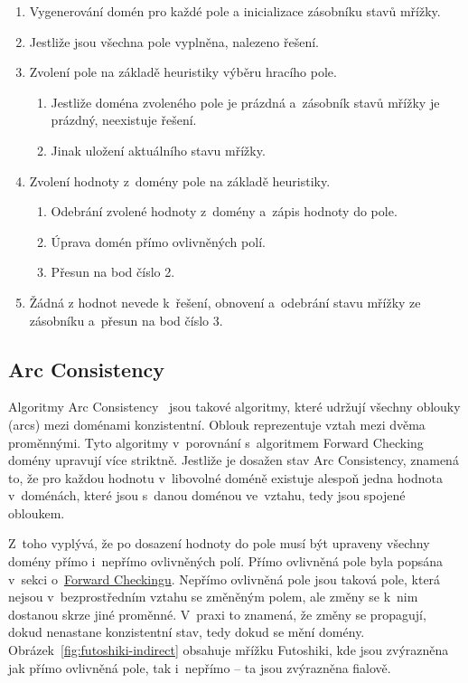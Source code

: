 \begin{enumerate}
    \item Vygenerování domén pro každé pole a inicializace zásobníku stavů
        mřížky.
    \item Jestliže jsou všechna pole vyplněna, nalezeno řešení.
    \item Zvolení pole na základě heuristiky výběru hracího pole.
    \begin{enumerate}
        \item Jestliže doména zvoleného pole je prázdná a~zásobník stavů mřížky
            je prázdný, neexistuje řešení.
        \item Jinak uložení aktuálního stavu mřížky.
    \end{enumerate}
    \item Zvolení hodnoty z~domény pole na základě heuristiky.
    \begin{enumerate}
        \item Odebrání zvolené hodnoty z~domény a~zápis hodnoty do pole.
        \item Úprava domén přímo ovlivněných polí.
        \item Přesun na bod číslo 2.
    \end{enumerate}
    \item Žádná z hodnot nevede k~řešení, obnovení a~odebrání stavu mřížky ze
        zásobníku a~přesun na bod číslo 3.
\end{enumerate}

\subsection{Arc Consistency}

Algoritmy Arc Consistency~\cite{ConsistencyTechniques} jsou takové algoritmy,
které udržují všechny oblouky (arcs) mezi doménami konzistentní. Oblouk
reprezentuje vztah mezi dvěma proměnnými. Tyto algoritmy v~porovnání
s~algoritmem Forward Checking domény upravují více striktně. Jestliže je
dosažen stav Arc Consistency, znamená to, že pro každou hodnotu v~libovolné
doméně existuje alespoň jedna hodnota v~doménách, které jsou s~danou doménou
ve~vztahu, tedy jsou spojené obloukem.

Z~toho vyplývá, že po dosazení hodnoty do pole musí být upraveny všechny domény
přímo i~nepřímo ovlivněných polí. Přímo ovlivněná pole byla popsána v~sekci
o~\hyperref[sec:forwardChecking]{Forward Checkingu}. Nepřímo ovlivněná pole
jsou taková pole, která nejsou v~bezprostředním vztahu se změněným polem, ale
změny se k~nim dostanou skrze jiné proměnné. V~praxi to znamená, že změny se
propagují, dokud nenastane konzistentní stav, tedy dokud se mění domény.
Obrázek~\ref{fig:futoshiki-indirect} obsahuje mřížku Futoshiki, kde jsou
zvýrazněna jak přímo ovlivněná pole, tak i~nepřímo – ta jsou zvýrazněna
fialově.


